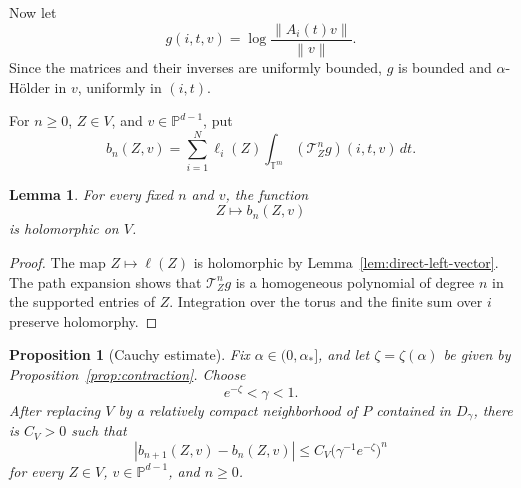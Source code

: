 \documentclass[11pt,a4paper]{amsart}
\newtheorem{proposition}[theorem]{Proposition}
\newtheorem{lemma}[theorem]{Lemma}
\newcommand{\T}{\mathbb T}
\newcommand{\PP}{\mathbb P}
\newcommand{\norm}[1]{\left\lVert #1\right\rVert}
\begin{document}

Now let
\[
 g(i,t,v)=\log\frac{\norm{A_i(t)v}}{\norm v}.
\]
Since the matrices and their inverses are uniformly bounded,
\(g\) is bounded and \(\alpha\)-Hölder in \(v\), uniformly in
\((i,t)\).

For \(n\ge0\), \(Z\in V\), and \(v\in\PP^{d-1}\), put
\begin{equation}\label{eq:direct-bn}
 b_n(Z,v)
 =
 \sum_{i=1}^N\ell_i(Z)
 \int_{\T^m}(\mathcal T_Z^ng)(i,t,v)\,dt.
\end{equation}

\begin{lemma}\label{lem:direct-holomorphic}
For every fixed \(n\) and \(v\), the function
\[
 Z\longmapsto b_n(Z,v)
\]
is holomorphic on \(V\).
\end{lemma}

\begin{proof}
The map \(Z\mapsto\boldsymbol\ell(Z)\) is holomorphic by
Lemma~\ref{lem:direct-left-vector}.  The path expansion shows that
\(\mathcal T_Z^ng\) is a homogeneous polynomial of degree \(n\) in
the supported entries of \(Z\).  Integration over the torus and the
finite sum over \(i\) preserve holomorphy.
\end{proof}


\begin{proposition}[Cauchy estimate]\label{prop:direct-cauchy}
Fix \(\alpha\in(0,\alpha_*]\), and let
\(\zeta=\zeta(\alpha)\) be given by
Proposition~\ref{prop:contraction}.  Choose
\[
 e^{-\zeta}<\gamma<1.
\]
After replacing \(V\) by a relatively compact neighborhood of \(P\)
contained in \(D_\gamma\), there is \(C_V>0\) such that
\[
 |b_{n+1}(Z,v)-b_n(Z,v)|
 \le
 C_V\bigl(\gamma^{-1}e^{-\zeta}\bigr)^n
\]
for every \(Z\in V\), \(v\in\PP^{d-1}\), and \(n\ge0\).
\end{proposition}
\end{document}
